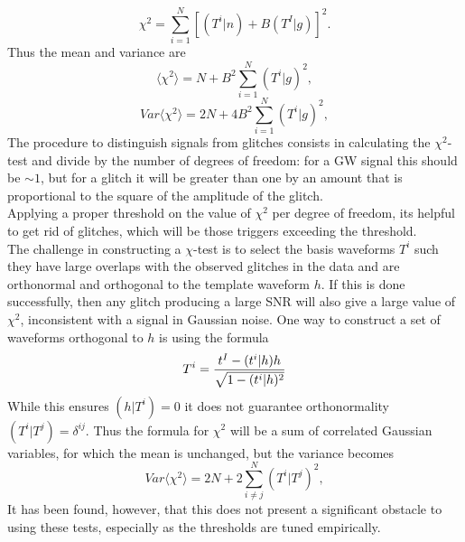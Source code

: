 \documentclass[binding=0.6cm, LaM]{sapthesis}
\begin{document}
		\begin{equation}
			\chi^2 =  \sum^N_{i=1}[(T^i|n) + B(T^I|g)]^2.
		\end{equation}
	Thus the mean and variance are 
		\begin{equation}
			\langle \chi^2 \rangle = N+ B^2\sum^N_{i=1}(T^i|g)^2, 
		\end{equation}
		\begin{equation}
			Var\langle \chi^2 \rangle=2N+ 4B^2\sum^N_{i=1}(T^i|g)^2, 
		\end{equation}
	The procedure to distinguish signals from glitches consists in calculating the $\chi^2$-test 
	and divide by the number of degrees of freedom: for a GW signal this should be $\sim 1$, 
	but for a glitch it will be greater than one by an amount that is proportional to the square of the amplitude of the glitch. \\
	Applying a proper threshold on the value of $\chi^2$ per degree of freedom, 
	its helpful to get rid of glitches, which will be those triggers exceeding the threshold. \\
	The challenge in constructing a $\chi$-test is to select the basis waveforms $T^i$ 	
	such they have large overlaps with the observed glitches in the data and 
	are orthonormal and orthogonal to the template waveform $h$. 
	If this is done successfully, then any glitch producing a large SNR will also give a large value of $\chi^2$, 
	inconsistent with a signal in Gaussian noise. 
	One way to construct a set of waveforms orthogonal to $h$ is using the formula
		\begin{equation}
			T^i = {{t^I-(t^i|h)h} \over {\sqrt{1-(t^i|h)^2}}}
		\end{equation}
	While this ensures $(h|T^i) = 0$ it does not guarantee orthonormality $(T^i|T^j)=\delta^{ij}$. 
	Thus the formula for $\chi^2$ will be a sum of correlated Gaussian variables, 
	for which the mean is unchanged, but the variance becomes
		\begin{equation}
			Var\langle \chi^2 \rangle=2N+ 2\sum^N_{i \neq j}(T^i|T^j)^2, 
		\end{equation}
	It has been found, however, that this does not present a significant obstacle to using these tests, 	
	especially as the thresholds are tuned empirically.
 
\end{document}
